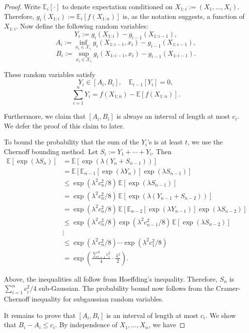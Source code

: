 \begin{proof}
    Write $\mathbb{E}_i[\cdot]$ to denote expectation conditioned on $X_{1:i} := (X_1, \ldots, X_i)$. Therefore, $g_i(X_{1:i}) := \mathbb{E}_i[f(X_{1:n})]$ is, as the notation suggests, a function of $X_{1:i}$. Now define the following random variables:
\[
Y_i := g_i(X_{1:i}) - g_{i-1}(X_{1:i-1}),
\]
\[
A_i := \inf_{x_i \in \mathcal{X}_i} g_i(X_{1:i-1}, x_i) - g_{i-1}(X_{1:i-1}),
\]
\[
B_i := \sup_{x_i \in \mathcal{X}_i} g_i(X_{1:i-1}, x_i) - g_{i-1}(X_{1:i-1}).
\]

These random variables satisfy
\[
Y_i \in [A_i, B_i], \quad \mathbb{E}_{i-1}[Y_i] = 0,
\]
\[
\sum_{i=1}^n Y_i = f(X_{1:n}) - \mathbb{E}[f(X_{1:n})].
\]

Furthermore, we claim that $[A_i, B_i]$ is always an interval of length at most $c_i$. We defer the proof of this claim to later.  

To bound the probability that the sum of the $Y_i$'s is at least $t$, we use the Chernoff bounding method. Let $S_i := Y_1 + \cdots + Y_i$. Then
\begin{align}
    \mathbb{E}[\exp(\lambda S_n)] 
    &= \mathbb{E}[\exp(\lambda(Y_n + S_{n-1}))] \\
    &= \mathbb{E}[\mathbb{E}_{n-1}[\exp(\lambda Y_n)] \exp(\lambda S_{n-1})]\\
    &\leq \exp(\lambda^2 c_n^2/8)\,\mathbb{E}[\exp(\lambda S_{n-1})]\\
    &= \exp(\lambda^2 c_n^2/8)\,\mathbb{E}[\exp(\lambda(Y_{n-1}+S_{n-2}))]\\
    &= \exp(\lambda^2 c_n^2/8)\,\mathbb{E}[\mathbb{E}_{n-2}[\exp(\lambda Y_{n-1})]\exp(\lambda S_{n-2})]\\
    &\leq \exp(\lambda^2 c_n^2/8)\exp(\lambda^2 c_{n-1}^2/8)\,\mathbb{E}[\exp(\lambda S_{n-2})]\\
    & \vdots \\
    &\leq \exp(\lambda^2 c_n^2/8)\cdots\exp(\lambda^2 c_1^2/8) \\
    &= \exp\left(\frac{\sum_{i=1}^n c_i^2}{4}\cdot\frac{\lambda^2}{2}\right).
\end{align}

Above, the inequalities all follow from Hoeffding's inequality. Therefore, $S_n$ is $\sum_{i=1}^n c_i^2/4$ sub-Gaussian. The probability bound now follows from the Cramer-Chernoff inequality for subgaussian random variables.

It remains to prove that $[A_i, B_i]$ is an interval of length at most $c_i$. We show that $B_i - A_i \leq c_i$. By independence of $X_1, \ldots, X_n$, we have


\end{proof}
